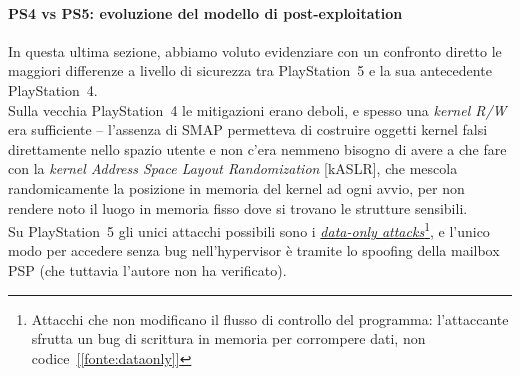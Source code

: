 \paragraph{PS4 vs PS5: evoluzione del modello di post-exploitation}
In questa ultima sezione, abbiamo voluto evidenziare con un confronto diretto le maggiori differenze a livello di sicurezza tra PlayStation~5 e la sua antecedente PlayStation~4.\\
Sulla vecchia PlayStation~4 le mitigazioni erano deboli, e spesso una \textit{kernel R/W} era sufficiente -- l'assenza di SMAP permetteva di costruire oggetti kernel falsi direttamente nello spazio utente e non c'era nemmeno bisogno di avere a che fare con la \textit{kernel Address Space Layout Randomization} [kASLR], 
che mescola randomicamente la posizione in memoria del kernel ad ogni avvio, per non rendere noto il luogo in memoria fisso dove si trovano le strutture sensibili.\\
Su PlayStation~5 gli unici attacchi possibili sono i \href{https://www.usenix.org/publications/loginonline/data-only-attacks-are-easier-you-think}{\textit{data-only attacks}}\footnote{Attacchi che non modificano il flusso di controllo del programma: l'attaccante sfrutta un bug di scrittura in memoria per corrompere dati, non codice~\hyperref[fonte:dataonly]{[\ref{fonte:dataonly}]}},
e l'unico modo per accedere senza bug nell'hypervisor è tramite lo spoofing della mailbox PSP (che tuttavia l'autore non ha verificato).
